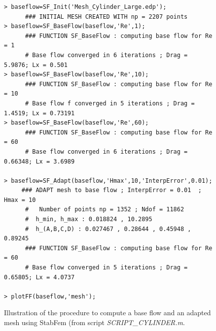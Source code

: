 \documentclass[twocolumn,10pt]{asme2ej}
\begin{document}
\begin{figure}
\small
\begin{lstlisting}
> baseflow=SF_Init('Mesh_Cylinder_Large.edp');
      ### INITIAL MESH CREATED WITH np = 2207 points
> baseflow=SF_BaseFlow(baseflow,'Re',1);
      ### FUNCTION SF_BaseFlow : computing base flow for Re = 1
      # Base flow converged in 6 iterations ; Drag = 5.9876; Lx = 0.501
> baseflow=SF_BaseFlow(baseflow,'Re',10);
      ### FUNCTION SF_BaseFlow : computing base flow for Re = 10
      # Base flow f converged in 5 iterations ; Drag = 1.4519; Lx = 0.73191
> baseflow=SF_BaseFlow(baseflow,'Re',60);
      ### FUNCTION SF_BaseFlow : computing base flow for Re = 60
      # Base flow converged in 6 iterations ; Drag = 0.66348; Lx = 3.6989

> baseflow=SF_Adapt(baseflow,'Hmax',10,'InterpError',0.01);
     ### ADAPT mesh to base flow ; InterpError = 0.01  ; Hmax = 10
      #   Number of points np = 1352 ; Ndof = 11862
      #  h_min, h_max : 0.018824 , 10.2895
      #  h_(A,B,C,D) : 0.027467 , 0.28644 , 0.45948 , 0.89245
      ### FUNCTION SF_BaseFlow : computing base flow for Re = 60
      # Base flow converged in 5 iterations ; Drag = 0.65805; Lx = 4.0737

> plotFF(baseflow,'mesh');
\end{lstlisting}
\normalsize
\caption{Illustration of the procedure to compute a base flow and an adapted mesh using StabFem (from script {\em SCRIPT\_CYLINDER.m}. }
\label{ill_bsflow}
\end{figure}
\end{document}
